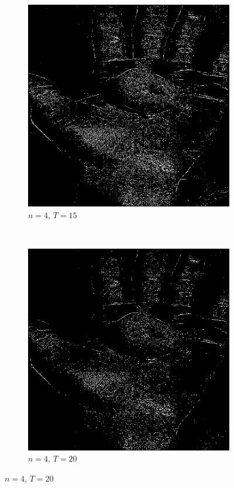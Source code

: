 \documentclass{article}
\begin{document}
\begin{enumerate}[label=(\alph*)]
\begin{figure}[!htb]
\begin{subfigure}[b]{0.3\textwidth}
            \includegraphics[width=\textwidth]{img/ED2_4_15.png}
            \caption{$n = 4$, $T = 15$}
        \end{subfigure}
        ~
        \begin{subfigure}[b]{0.3\textwidth}
            \includegraphics[width=\textwidth]{img/ED2_4_20.png}
            \caption{$n = 4$, $T = 20$}
        \end{subfigure}
        

\end{figure}
\end{enumerate}
\end{document}
